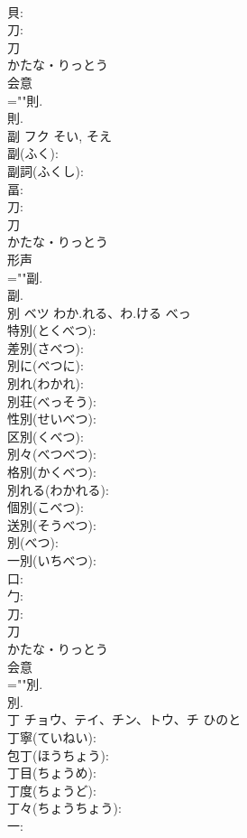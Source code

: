 \documentclass[8pt]{extreport}
\begin{document}
\begin{CJK}{UTF8}{min}
\\	貝: 
\\	刀: 
\\	刀	
\\	かたな・りっとう	
\\	会意 
\\	=""則.
\\	則.
\\	副	フク		そい, そえ	
\\	副(ふく): 
\\	副詞(ふくし): 
\\	畐: 
\\	刀: 
\\	刀	
\\	かたな・りっとう	
\\	形声 
\\	=""副.
\\	副.
\\	別	ベツ	わか.れる、わ.ける	べっ	
\\	特別(とくべつ): 
\\	差別(さべつ): 
\\	別に(べつに): 
\\	別れ(わかれ): 
\\	別荘(べっそう): 
\\	性別(せいべつ): 
\\	区別(くべつ): 
\\	別々(べつべつ): 
\\	格別(かくべつ): 
\\	別れる(わかれる): 
\\	個別(こべつ): 
\\	送別(そうべつ): 
\\	別(べつ): 
\\	一別(いちべつ): 
\\	口: 
\\	勹: 
\\	刀: 
\\	刀	
\\	かたな・りっとう	
\\	会意 
\\	=""別.
\\	別.
\\	丁	チョウ、テイ、チン、トウ、チ	ひのと		
\\	丁寧(ていねい): 
\\	包丁(ほうちょう): 
\\	丁目(ちょうめ): 
\\	丁度(ちょうど): 
\\	丁々(ちょうちょう): 
\\	一: 

\end{CJK}
\end{document}
